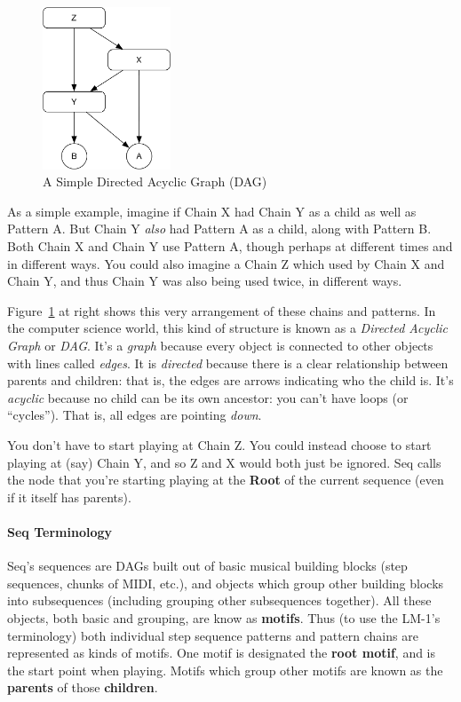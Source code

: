 \documentclass[twoside,10pt]{article}
\begin{document}
\begin{figure}
\vspace{-1em}
\includegraphics[width=1.5in]{dag}
\caption{A Simple Directed Acyclic Graph (DAG)}
\label{dag}
\end{figure}

As a simple example, imagine if Chain X had Chain Y as a child as well as Pattern A.  But Chain Y {\it also} had Pattern A as a child, along with Pattern B.  Both Chain X and Chain Y use Pattern A, though perhaps at different times and in different ways.  You could also imagine a Chain Z which used by Chain X and Chain Y, and thus Chain Y was also being used twice, in different ways.

Figure~\ref{dag} at right shows this very arrangement of these chains and patterns. In the computer science world, this kind of structure is known as a {\it Directed Acyclic Graph} or {\it DAG}.  It's a {\it graph} because every object is connected to other objects with lines called {\it edges}.  It is {\it directed} because there is a clear relationship between parents and children: that is, the edges are arrows indicating who the child is.  It's {\it acyclic} because no child can be its own ancestor: you can't have loops (or ``cycles'').  That is, all edges are pointing {\it down}.

You don't have to start playing at Chain Z.  You could instead choose to start playing at (say) Chain Y, and so Z and X would both just be ignored.  Seq calls the node that you're starting playing at the {\bf Root} of the current sequence (even if it itself has parents).

\paragraph{Seq Terminology}

Seq's sequences are DAGs built out of basic musical building blocks (step sequences, chunks of MIDI, etc.), and objects which group other building blocks into subsequences (including grouping other subsequences together).  All these objects, both basic and grouping, are know as {\bf motifs}.  Thus (to use the LM-1's terminology) both individual step sequence patterns and pattern chains are represented as kinds of motifs.  One motif is designated the {\bf root motif}, and is the start point when playing.  Motifs which group other motifs are known as the {\bf parents} of those {\bf children}.  
\end{document}
